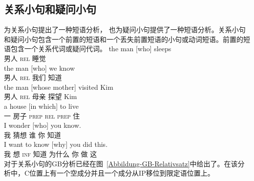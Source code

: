 \begin{exe}
\begin{xlist}[iv.]
\begin{exe}
\begin{xlist}[iv.]
\subsection{关系小句和疑问小句}
\label{Abschnitt-Relativ-Interrogativsaetze}
\mbox{} \citet{Sag97a}为关系小句提出了一种短语分析， \citet{GSag2000a-u}也为疑问小句提供了一种短语分析。关系小句和疑问小句包含一个前置的短语和一个丢失前置短语的小句或动词短语。前置的短语包含一个关系代词或疑问代词。
\eal
\ex
\gll the man [who] sleeps\\
      男人 \spacebr{}\textsc{rel} 睡觉\\
\ex
\gll the man [who] we know\\
      男人 \spacebr{}\textsc{rel} 我们 知道\\
\ex
\gll the man [whose mother] visited Kim\\
      男人 \spacebr{}\textsc{rel} 母亲 探望 Kim\\
\ex
\gll a house [in which] to live\\
     一 房子 \spacebr{}\textsc{prep} \textsc{rel} \textsc{prep} 住\\
\zl
\eal
\ex
\gll I wonder [who] you know.\\
     我 猜想 \spacebr{}谁 你 知道\\
\ex
\gll  I want to know [why] you did this.\\
     我 想 \textsc{inf} 知道 \spacebr{}为什么 你 做 这\\
\zl
对于关系小句的GB分析已经在图~\ref{Abbildung-GB-Relativsatz}中给出了。在该分析中，C位置上有一个空成分并且一个成分从IP移位到限定语位置上。%

\end{xlist}
\end{exe}
\end{xlist}
\end{exe}
